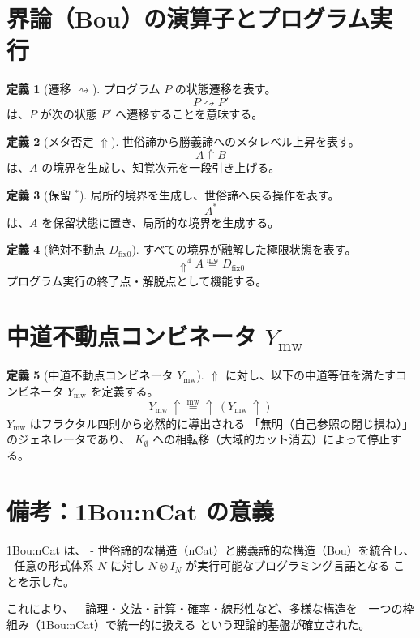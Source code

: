 \documentclass[11pt,a4paper]{article}
\theoremstyle{definition}
\newtheorem{definition}{定義}[section]
\newcommand{\dfix}{D_{\mathrm{fix}0}} %
\newcommand{\mweq}{\mathrel{\overset{\mathrm{mw}}{=}}}
\newcommand{\metanegation}{\Uparrow}
\newcommand{\Kvoid}{K_{\emptyset}}
\newcommand{\Leadsto}{\rightsquigarrow}
\newcommand{\susp}[1]{#1^*}
\newcommand{\Ymw}{Y_{\mathrm{mw}}}
\begin{document}
\section{界論（Bou）の演算子とプログラム実行}

\begin{definition}[遷移 $\Leadsto$]
プログラム $P$ の状態遷移を表す。
$$P \Leadsto P'$$
は、$P$ が次の状態 $P'$ へ遷移することを意味する。
\end{definition}

\begin{definition}[メタ否定 $\metanegation$]
世俗諦から勝義諦へのメタレベル上昇を表す。
$$A \metanegation B$$
は、$A$ の境界を生成し、知覚次元を一段引き上げる。
\end{definition}

\begin{definition}[保留 $\susp{}$]
局所的境界を生成し、世俗諦へ戻る操作を表す。
$$\susp{A}$$
は、$A$ を保留状態に置き、局所的な境界を生成する。
\end{definition}

\begin{definition}[絶対不動点 $\dfix$]
すべての境界が融解した極限状態を表す。
$$\metanegation^4 A \mweq \dfix$$
プログラム実行の終了点・解脱点として機能する。
\end{definition}

\section{中道不動点コンビネータ $\Ymw$}

\begin{definition}[中道不動点コンビネータ $\Ymw$]
$\metanegation$ に対し、以下の中道等価を満たすコンビネータ $\Ymw$ を定義する。
$$\Ymw\, \metanegation \mweq \metanegation\,(\Ymw\, \metanegation)$$
$\Ymw$ はフラクタル四則から必然的に導出される
「無明（自己参照の閉じ損ね）」のジェネレータであり、
$\Kvoid$ への相転移（大域的カット消去）によって停止する。
\end{definition}

\section*{備考：1Bou:nCat の意義}

1Bou:nCat は、
- 世俗諦的な構造（nCat）と勝義諦的な構造（Bou）を統合し、
- 任意の形式体系 $N$ に対し $N \otimes I_N$ が実行可能なプログラミング言語となる
ことを示した。

これにより、
- 論理・文法・計算・確率・線形性など、多様な構造を
- 一つの枠組み（1Bou:nCat）で統一的に扱える
という理論的基盤が確立された。
\end{document}
